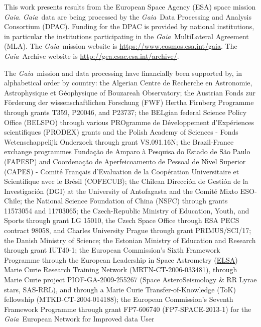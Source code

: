 \documentclass[longauth]{aa_gaia} %
\newcommand\gaia{\textit{Gaia}}
\begin{document}
\begin{acknowledgements}

This work presents results from the European Space Agency (ESA) space mission \gaia. \gaia\ data are
being processed by the \gaia\ Data Processing and Analysis Consortium (DPAC). Funding for the DPAC
is provided by national institutions, in particular the institutions participating in the \gaia\
MultiLateral Agreement (MLA). The \gaia\ mission website is \url{https://www.cosmos.esa.int/gaia}.
The \gaia\ Archive website is \url{http://gea.esac.esa.int/archive/}.

The \gaia\ mission and data processing have financially been supported by, in alphabetical order by country:
the Algerian Centre de Recherche en Astronomie, Astrophysique et G\'{e}ophysique of Bouzareah Observatory;
the Austrian Fonds zur F\"{o}rderung der wissenschaftlichen Forschung (FWF) Hertha Firnberg Programme through grants T359, P20046, and P23737;
the BELgian federal Science Policy Office (BELSPO) through various PROgramme de D\'eveloppement
d'Exp\'eriences scientifiques (PRODEX) grants and the Polish Academy of Sciences - Fonds
Wetenschappelijk Onderzoek through grant VS.091.16N;
the Brazil-France exchange programmes Funda\c{c}\~{a}o de Amparo \`{a} Pesquisa do Estado de S\~{a}o
Paulo (FAPESP) and Coordena\c{c}\~{a}o de Aperfeicoamento de Pessoal de N\'{\i}vel Superior (CAPES)
- Comit\'{e} Fran\c{c}ais d'Evaluation de la Coop\'{e}ration Universitaire et Scientifique avec le
Br\'{e}sil (COFECUB);
the Chilean Direcci\'{o}n de Gesti\'{o}n de la Investigaci\'{o}n (DGI) at the University of Antofagasta and the Comit\'e Mixto ESO-Chile;
the National Science Foundation of China (NSFC) through grants 11573054 and 11703065;  
the Czech-Republic Ministry of Education, Youth, and Sports through grant LG 15010, the Czech Space
Office through ESA PECS contract 98058, and Charles University Prague through grant PRIMUS/SCI/17;    
the Danish Ministry of Science;
the Estonian Ministry of Education and Research through grant IUT40-1;
the European Commission’s Sixth Framework Programme through the European Leadership in Space
Astrometry (\href{https://www.cosmos.esa.int/web/gaia/elsa-rtn-programme}{ELSA}) Marie Curie
Research Training Network (MRTN-CT-2006-033481), through Marie Curie project PIOF-GA-2009-255267
(Space AsteroSeismology \& RR Lyrae stars, SAS-RRL), and through a Marie Curie Transfer-of-Knowledge
(ToK) fellowship (MTKD-CT-2004-014188); the European Commission's Seventh Framework Programme
through grant FP7-606740 (FP7-SPACE-2013-1) for the \gaia\ European Network for Improved data User

\end{acknowledgements}
\end{document}
